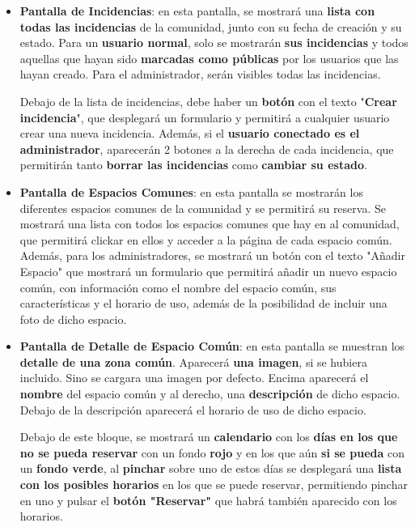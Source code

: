 \begin{appendices}
\begin{itemize}
 
	

	
	\item \textbf{Pantalla de Incidencias}: en esta pantalla, se mostrará una \textbf{lista con todas las incidencias} de la comunidad, junto con su fecha de creación y su estado. Para un \textbf{usuario normal}, solo se mostrarán \textbf{sus incidencias} y todos aquellas que hayan sido \textbf{marcadas como públicas} por los usuarios que las hayan creado. Para el administrador, serán visibles todas las incidencias.
	
	Debajo de la lista de incidencias, debe haber un \textbf{botón} con el texto "\textbf{Crear incidencia}", que desplegará un formulario y permitirá a cualquier usuario crear una nueva incidencia. Además, si el \textbf{usuario conectado es el administrador}, aparecerán 2 botones a la derecha de cada incidencia, que permitirán tanto \textbf{borrar las incidencias} como \textbf{cambiar su estado}.
		
	\item \textbf{Pantalla de Espacios Comunes}: en esta pantalla se mostrarán los diferentes espacios comunes de la comunidad y se permitirá su reserva. Se mostrará una lista con todos los espacios comunes que hay en al comunidad, que permitirá clickar en ellos y acceder a la página de cada espacio común. Además, para los administradores, se mostrará un botón con el texto "Añadir Espacio" que mostrará un formulario que permitirá añadir un nuevo espacio común, con información como el nombre del espacio común, sus características y el horario de uso, además de la posibilidad de incluir una foto de dicho espacio.
	
	\item \textbf{Pantalla de Detalle de Espacio Común}: en esta pantalla se muestran los \textbf{detalle de una zona común}. Aparecerá \textbf{una imagen}, si se hubiera incluido. Sino se cargara una imagen por defecto. Encima aparecerá el \textbf{nombre} del espacio común y al derecho, una \textbf{descripción} de dicho espacio. Debajo de la descripción aparecerá el horario de uso de dicho espacio.
	
	Debajo de este bloque, se mostrará un \textbf{calendario} con los \textbf{días en los que no se pueda reservar} con un fondo \textbf{rojo} y en los que aún \textbf{si se pueda} con un \textbf{fondo verde}, al \textbf{pinchar} sobre uno de estos días se desplegará una \textbf{lista con los posibles horarios} en los que se puede reservar, permitiendo pinchar en uno y pulsar el \textbf{botón "Reservar"} que habrá también aparecido con los horarios. 
	

\end{itemize}
\end{appendices}
